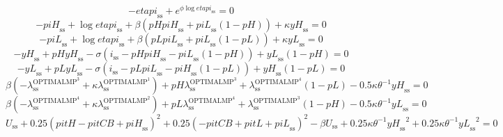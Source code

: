 \begin{equation}
-{e\!t\!a\!p\!i}_\mathrm{ss} + e^{{\phi} {\log{{e\!t\!a\!p\!i}_\mathrm{ss}}}} = 0
\end{equation}
\begin{equation}
-{p\!i\!H}_\mathrm{ss} + \log{{e\!t\!a\!p\!i}_\mathrm{ss}} + {\beta} \left({{p\!H}} {{p\!i\!H}_\mathrm{ss}} + {{p\!i\!L}_\mathrm{ss}} \left(1 - {p\!H}\right)\right) + {\kappa} {{y\!H}_\mathrm{ss}} = 0
\end{equation}
\begin{equation}
-{p\!i\!L}_\mathrm{ss} + \log{{e\!t\!a\!p\!i}_\mathrm{ss}} + {\beta} \left({{p\!L}} {{p\!i\!L}_\mathrm{ss}} + {{p\!i\!L}_\mathrm{ss}} \left(1 - {p\!L}\right)\right) + {\kappa} {{y\!L}_\mathrm{ss}} = 0
\end{equation}
\begin{equation}
-{y\!H}_\mathrm{ss} + {{p\!H}} {{y\!H}_\mathrm{ss}} - {\sigma} \left(i_\mathrm{ss} - {{p\!H}} {{p\!i\!H}_\mathrm{ss}} - {{p\!i\!L}_\mathrm{ss}} \left(1 - {p\!H}\right)\right) + {{y\!L}_\mathrm{ss}} \left(1 - {p\!H}\right) = 0
\end{equation}
\begin{equation}
-{y\!L}_\mathrm{ss} + {{p\!L}} {{y\!L}_\mathrm{ss}} - {\sigma} \left(i_\mathrm{ss} - {{p\!L}} {{p\!i\!L}_\mathrm{ss}} - {{p\!i\!H}_\mathrm{ss}} \left(1 - {p\!L}\right)\right) + {{y\!H}_\mathrm{ss}} \left(1 - {p\!L}\right) = 0
\end{equation}
\begin{equation}
{\beta} \left(-\lambda^{\mathrm{OPTIMALMP}^{\mathrm{3}}}_\mathrm{ss} + {\kappa} {\lambda^{\mathrm{OPTIMALMP}^{\mathrm{1}}}_\mathrm{ss}}\right) + {{p\!H}} {\lambda^{\mathrm{OPTIMALMP}^{\mathrm{3}}}_\mathrm{ss}} + {\lambda^{\mathrm{OPTIMALMP}^{\mathrm{4}}}_\mathrm{ss}} \left(1 - {p\!L}\right) - 0.5{\kappa} {\theta}^{-1} {{y\!H}_\mathrm{ss}} = 0
\end{equation}
\begin{equation}
{\beta} \left(-\lambda^{\mathrm{OPTIMALMP}^{\mathrm{4}}}_\mathrm{ss} + {\kappa} {\lambda^{\mathrm{OPTIMALMP}^{\mathrm{2}}}_\mathrm{ss}}\right) + {{p\!L}} {\lambda^{\mathrm{OPTIMALMP}^{\mathrm{4}}}_\mathrm{ss}} + {\lambda^{\mathrm{OPTIMALMP}^{\mathrm{3}}}_\mathrm{ss}} \left(1 - {p\!H}\right) - 0.5{\kappa} {\theta}^{-1} {{y\!L}_\mathrm{ss}} = 0
\end{equation}
\begin{equation}
U_\mathrm{ss} + 0.25\left({p\!i\!t\!H} - {p\!i\!t\!C\!B} + {p\!i\!H}_\mathrm{ss}\right)^{2} + 0.25\left(-{p\!i\!t\!C\!B} + {p\!i\!t\!L} + {p\!i\!L}_\mathrm{ss}\right)^{2} - {\beta} {U_\mathrm{ss}} + 0.25{\kappa} {\theta}^{-1} {{y\!H}_\mathrm{ss}}^{2} + 0.25{\kappa} {\theta}^{-1} {{y\!L}_\mathrm{ss}}^{2} = 0
\end{equation}
